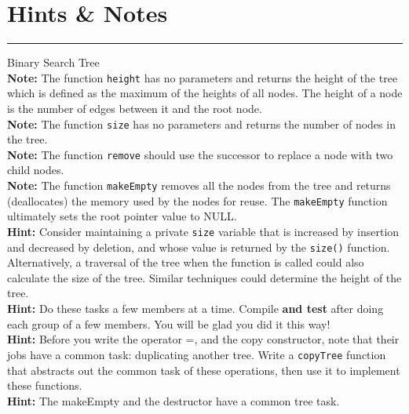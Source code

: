 \documentclass[12pt]{article}
\newcommand{\mysection}[1]{\section*{#1}\hrule\vspace{8pt}\addcontentsline{toc}{section}{#1}}
\begin{document}
\mysection{Hints \& Notes}
{\large Binary Search Tree}
\\[2mm]
\textbf{Note:} The function \verb|height| has no parameters and returns the height of the tree which is defined as the maximum of the heights of all nodes. The height of a node is the number of edges between it and the root node.
\\[2mm]
\textbf{Note:} The function \verb|size| has no parameters and returns the number of nodes in the tree.
\\[2mm]
\textbf{Note:} The function \verb|remove| should use the successor to replace a node with two child nodes.
\\[2mm]
\textbf{Note:} The function \verb|makeEmpty| removes all the nodes from the tree and returns (deallocates) the memory used by the nodes for reuse. The \verb|makeEmpty| function ultimately sets the root pointer value to NULL.
\\[4mm]
\textbf{Hint:} Consider maintaining a private \verb|size| variable that is increased by insertion and decreased by deletion, and whose value is returned by the \verb|size()| function. Alternatively, a traversal of the tree when the function is called could also calculate the size of the tree. Similar techniques could determine the height of the tree.
\\[2mm]
\textbf{Hint:} Do these tasks a few members at a time. Compile \textbf{and test} after doing each group of a few members. You will be glad you did it this way!
\\[2mm]
\textbf{Hint: }  Before you write the operator =, and the copy constructor, note that their jobs have a common task: duplicating another tree. Write a \verb|copyTree| function that abstracts out the common task of these operations, then use it to implement these functions.
\\[2mm]
\textbf{Hint: } The makeEmpty and the destructor have a common tree task.


\newpage\noindent
\end{document}
